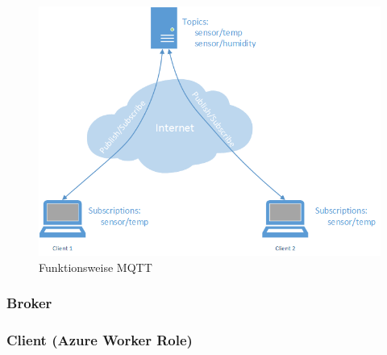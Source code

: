 \begin{figure}[h!]
	\centering
		\includegraphics[scale=0.6]{report/img/mqttFunktionsweise}
	\caption{Funktionsweise MQTT}
	\label{fig:deploymentAzure}
\end{figure}

\subsubsection{Broker}

\subsubsection{Client (Azure Worker Role)}






